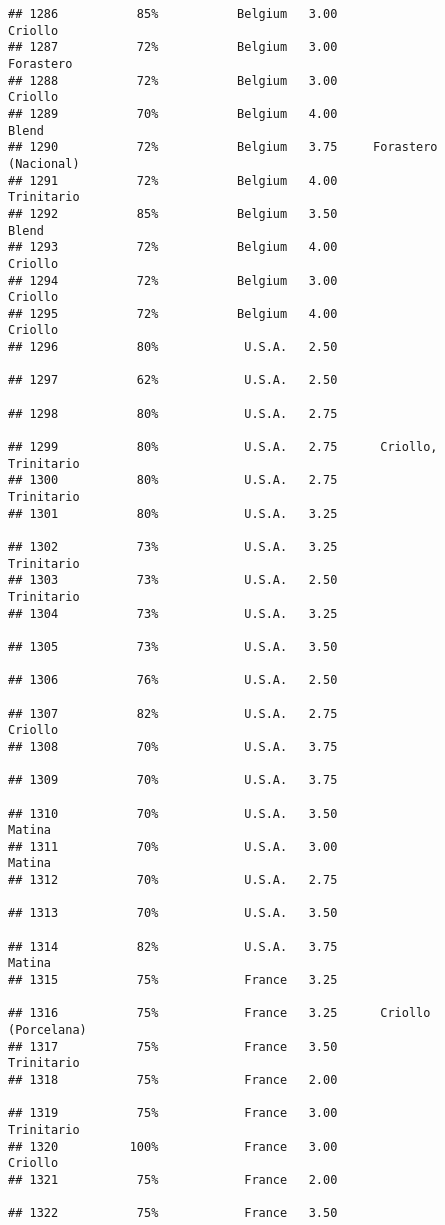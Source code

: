 \documentclass[
]{article}
\begin{document}
\begin{verbatim}
## 1286           85%           Belgium   3.00                  Criollo
## 1287           72%           Belgium   3.00                Forastero
## 1288           72%           Belgium   3.00                  Criollo
## 1289           70%           Belgium   4.00                    Blend
## 1290           72%           Belgium   3.75     Forastero (Nacional)
## 1291           72%           Belgium   4.00               Trinitario
## 1292           85%           Belgium   3.50                    Blend
## 1293           72%           Belgium   4.00                  Criollo
## 1294           72%           Belgium   3.00                  Criollo
## 1295           72%           Belgium   4.00                  Criollo
## 1296           80%            U.S.A.   2.50                         
## 1297           62%            U.S.A.   2.50                         
## 1298           80%            U.S.A.   2.75                         
## 1299           80%            U.S.A.   2.75      Criollo, Trinitario
## 1300           80%            U.S.A.   2.75               Trinitario
## 1301           80%            U.S.A.   3.25                         
## 1302           73%            U.S.A.   3.25               Trinitario
## 1303           73%            U.S.A.   2.50               Trinitario
## 1304           73%            U.S.A.   3.25                         
## 1305           73%            U.S.A.   3.50                         
## 1306           76%            U.S.A.   2.50                         
## 1307           82%            U.S.A.   2.75                  Criollo
## 1308           70%            U.S.A.   3.75                         
## 1309           70%            U.S.A.   3.75                         
## 1310           70%            U.S.A.   3.50                   Matina
## 1311           70%            U.S.A.   3.00                   Matina
## 1312           70%            U.S.A.   2.75                         
## 1313           70%            U.S.A.   3.50                         
## 1314           82%            U.S.A.   3.75                   Matina
## 1315           75%            France   3.25                         
## 1316           75%            France   3.25      Criollo (Porcelana)
## 1317           75%            France   3.50               Trinitario
## 1318           75%            France   2.00                         
## 1319           75%            France   3.00               Trinitario
## 1320          100%            France   3.00                  Criollo
## 1321           75%            France   2.00                         
## 1322           75%            France   3.50                         

\end{verbatim}
\end{document}
